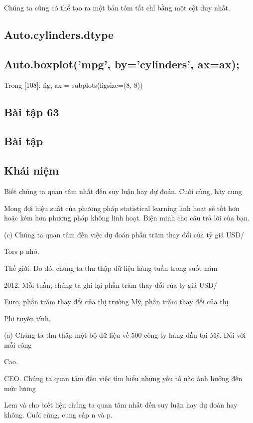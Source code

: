 Chúng ta cũng có thể tạo ra một bản tóm tắt chỉ bằng một cột duy nhất.

\subsection{Auto.cylinders.dtype}

\subsection{Auto.boxplot('mpg', by='cylinders', ax=ax);}

Trong [108]: fig, ax = subplots(figsize=(8, 8))

\subsection{Bài tập 63}

\subsection{Bài tập}

\subsection{Khái niệm}

Biết chúng ta quan tâm nhất đến suy luận hay dự đoán. Cuối cùng, hãy cung

Mong đợi hiệu suất của phương pháp statistical learning linh hoạt sẽ tốt hơn hoặc kém hơn phương pháp không linh hoạt. Biện minh cho câu trả lời của bạn.

(c) Chúng ta quan tâm đến việc dự đoán phần trăm thay đổi của tỷ giá USD/

Tors p nhỏ.

Thế giới. Do đó, chúng ta thu thập dữ liệu hàng tuần trong suốt năm

2012. Mỗi tuần, chúng ta ghi lại phần trăm thay đổi của tỷ giá USD/

Euro, phần trăm thay đổi của thị trường Mỹ, phần trăm thay đổi của thị

Phi tuyến tính.

(a) Chúng ta thu thập một bộ dữ liệu về 500 công ty hàng đầu tại Mỹ. Đối với mỗi công

Cao.

CEO. Chúng ta quan tâm đến việc tìm hiểu những yếu tố nào ảnh hưởng đến mức lương

Lem và cho biết liệu chúng ta quan tâm nhất đến suy luận hay dự đoán hay không. Cuối cùng, cung cấp n và p.


